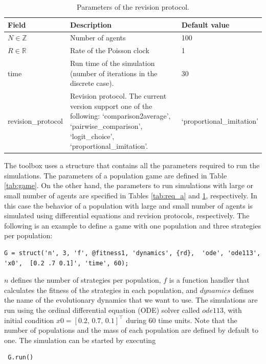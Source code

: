 \begin{table}[tbh]
\begin{center}
\begin{tabular}{l| p{} |l}\hline
Field & Description & Default value \\ \hline
$N\in\mathbb{Z}$ & Number of agents & 100 \\
$R\in\mathbb{R}$ & Rate of the Poisson clock & 1 \\
time & Run time of the simulation (number of iterations in the discrete case). & 30 \\
revision\_protocol & Revision protocol. The current version support one of the following: `comparison2average', `pairwise\_comparison', `logit\_choice', `proportional\_imitation'. & `proportional\_imitation' \\ \hline
\end{tabular}
\end{center}
\caption{Parameters of the revision protocol.}
\label{tab:req_b}
\end{table}




The toolbox uses a structure that contains all the parameters required to run the simulations. The parameters of a population game are defined in Table \ref{tab:game}. On the other hand, the parameters to run simulations with large or small number of agents are specified in Tables \ref{tab:req_a} and \ref{tab:req_b}, respectively.  In this case the behavior of a population with large and small number of agents is simulated using differential equations and revision protocols, respectively. The following is an example to define a game with one population and three strategies per population:
%
\begin{lstlisting}
G = struct('n', 3, 'f', @fitness1, 'dynamics', {rd},  'ode', 'ode113', 'x0',  [0.2 .7 0.1]', 'time', 60);
\end{lstlisting}
%
$n$ defines the number of strategies per population, $f$ is a function handler that calculates the fitness of the strategies in each population, and $dynamics$ defines the name of the evolutionary dynamics that we want to use. The simulations are run using the ordinal differential equation (ODE) solver called $ode113$, with initial condition $x0 = [0.2, \, 0.7, \, 0.1 ]^\top$ during $60$ time units.
Note that the number of populations and the mass of each population are defined by default to one.  The simulation can be started by executing
%
\begin{lstlisting}
 G.run()
\end{lstlisting}




